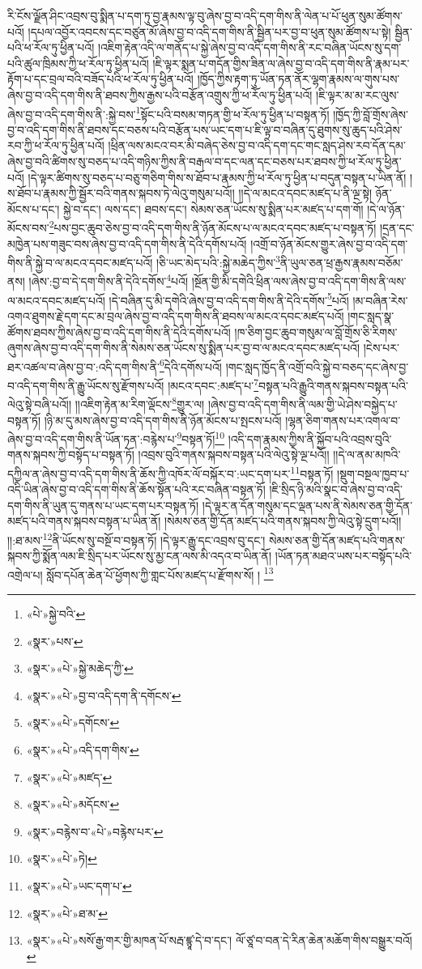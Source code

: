 རི་ངོས་ལྗོན་ཤིང་འབྲས་བུ་སྨིན་པ་དག་ཏུ་བྱ་རྣམས་ལྟ་བུ་ཞེས་བྱ་བ་འདི་དག་གིས་ནི་ལེན་པ་པོ་ཕུན་སུམ་ཚོགས་པའོ། །དཔལ་འབྱོར་འབངས་དང་བཙུན་མོ་ཞེས་བྱ་བ་འདི་དག་གིས་ནི་སྦྱིན་པར་བྱ་བ་ཕུན་སུམ་ཚོགས་པ་སྟེ། སྦྱིན་པའི་ཕ་རོལ་ཏུ་ཕྱིན་པའོ། །འཇིག་རྟེན་འདི་ལ་གནོད་པ་སྐྱེ་ཞེས་བྱ་བ་འདི་དག་གིས་ནི་རང་བཞིན་ཡོངས་སུ་དག་པའི་ཚུལ་ཁྲིམས་ཀྱི་ཕ་རོལ་ཏུ་ཕྱིན་པའོ། །ཇི་ལྟར་སྨན་པ་གདོན་གྱིས་ཟིན་ལ་ཞེས་བྱ་བ་འདི་དག་གིས་ནི་རྣམ་པར་རྟོག་པ་དང་བྲལ་བའི་བཟོད་པའི་ཕ་རོལ་ཏུ་ཕྱིན་པའོ། །ཁྱོད་ཀྱིས་རྟག་ཏུ་ཡོན་ཏན་ནོར་ལྷག་རྣམས་ལ་གུས་པས་ཞེས་བྱ་བ་འདི་དག་གིས་ནི་ཐབས་ཀྱིས་རྒྱས་པའི་བརྩོན་འགྲུས་ཀྱི་ཕ་རོལ་ཏུ་ཕྱིན་པའོ། །ཇི་ལྟར་མ་མ་རང་ལུས་ཞེས་བྱ་བ་འདི་དག་གིས་ནི་:སྐྱེ་བས་\footnote{«པེ་»སྐྱེ་བའི་}སྟོང་པའི་བསམ་གཏན་གྱི་ཕ་རོལ་ཏུ་ཕྱིན་པ་བསྟན་ཏོ། །ཁྱོད་ཀྱི་བློ་གྲོས་ཞེས་བྱ་བ་འདི་དག་གིས་ནི་ཐབས་དང་བཅས་པའི་བརྩོན་པས་ཡང་དག་པ་ཇི་ལྟ་བ་བཞིན་དུ་ཐུགས་སུ་ཆུད་པའི་ཤེས་རབ་ཀྱི་ཕ་རོལ་ཏུ་ཕྱིན་པའོ། །ཕྲིན་ལས་མངའ་བར་མི་བཞེད་ཅེས་བྱ་བ་འདི་དག་དང་གང་སླད་ཤེས་རབ་དོན་དམ་ཞེས་བྱ་བའི་ཚིགས་སུ་བཅད་པ་འདི་གཉིས་ཀྱིས་ནི་བརྒལ་བ་དང་ལན་དང་བཅས་པར་ཐབས་ཀྱི་ཕ་རོལ་ཏུ་ཕྱིན་པའོ། །དེ་ལྟར་ཚིགས་སུ་བཅད་པ་བཅུ་གཅིག་གིས་ས་ཐོབ་པ་རྣམས་ཀྱི་ཕ་རོལ་ཏུ་ཕྱིན་པ་བདུན་བསྟན་པ་ཡིན་ནོ། །ས་ཐོབ་པ་རྣམས་ཀྱི་སྦྱོར་བའི་གནས་སྐབས་ཏེ་ལེའུ་གསུམ་པའོ།། །།དེ་ལ་མངའ་དབང་མཛད་པ་ནི་ལྔ་སྟེ། ཉོན་མོངས་པ་དང་། སྐྱེ་བ་དང་། ལས་དང་། ཐབས་དང་། སེམས་ཅན་ཡོངས་སུ་སྨིན་པར་མཛད་པ་དག་གོ། །དེ་ལ་ཉོན་མོངས་བས་\footnote{«སྣར་»པས་}པས་བྱང་ཆུབ་ཅེས་བྱ་བ་འདི་དག་གིས་ནི་ཉོན་མོངས་པ་ལ་མངའ་དབང་མཛད་པ་བསྟན་ཏོ། །དྲན་དང་མཁྱེན་པས་གཟུང་བས་ཞེས་བྱ་བ་འདི་དག་གིས་ནི་དེའི་དགོས་པའོ། །འགྲོ་བ་ཉོན་མོངས་གྱུར་ཞེས་བྱ་བ་འདི་དག་གིས་ནི་སྐྱེ་བ་ལ་མངའ་དབང་མཛད་པའོ། །ཅི་ཡང་མེད་པའི་:སྐྱེ་མཆེད་ཀྱིས་\footnote{«སྣར་»«པེ་»སྐྱེ་མཆེད་ཀྱི་}ནི་ཡུལ་ཅན་ཕྲ་རྒྱས་རྣམས་བཅོམ་ནས། །ཞེས་:བྱ་བ་དེ་དག་གིས་ནི་དེའི་དགོས་\footnote{«སྣར་»«པེ་»བྱ་བ་འདི་དག་ནི་དགོངས་}པའོ། །སྔོན་གྱི་མི་དགེའི་ཕྲིན་ལས་ཞེས་བྱ་བ་འདི་དག་གིས་ནི་ལས་ལ་མངའ་དབང་མཛད་པའོ། །དེ་བཞིན་དུ་མི་དགེའི་ཞེས་བྱ་བ་འདི་དག་གིས་ནི་དེའི་དགོས་\footnote{«སྣར་»«པེ་»དགོངས་}པའོ། །མ་བཞིན་རེས་འགའ་ཐུགས་རྗེ་དག་དང་མ་བྲལ་ཞེས་བྱ་བ་འདི་དག་གིས་ནི་ཐབས་ལ་མངའ་དབང་མཛད་པའོ། །གང་སླད་སྣ་ཚོགས་ཐབས་ཀྱིས་ཞེས་བྱ་བ་འདི་དག་གིས་ནི་དེའི་དགོས་པའོ། །ཁ་ཅིག་བྱང་ཆུབ་གསུམ་ལ་བློ་གྲོས་ཅི་རིགས་ཞུགས་ཞེས་བྱ་བ་འདི་དག་གིས་ནི་སེམས་ཅན་ཡོངས་སུ་སྨིན་པར་བྱ་བ་ལ་མངའ་དབང་མཛད་པའོ། །ངེས་པར་ཐར་འཚལ་བ་ཞེས་བྱ་བ་:འདི་དག་གིས་ནི་\footnote{«སྣར་»«པེ་»འདི་དག་གིས་}དེའི་དགོས་པའོ། །གང་སླད་ཁྱོད་ནི་འགྲོ་བའི་སྐྱེ་བ་བཅད་དང་ཞེས་བྱ་བ་འདི་དག་གིས་ནི་རྒྱུ་ཡོངས་སུ་རྫོགས་པའོ། །མངའ་དབང་:མཛད་པ་\footnote{«སྣར་»«པེ་»མཛད་}བསྟན་པའི་རྒྱུའི་གནས་སྐབས་བསྟན་པའི་ལེའུ་སྟེ་བཞི་པའོ།། །།འཇིག་རྟེན་མ་རིག་ལྡོངས་\footnote{«སྣར་»«པེ་»མདོངས་}གྱུར་ལ། །ཞེས་བྱ་བ་འདི་དག་གིས་ནི་ལམ་གྱི་ཡེ་ཤེས་བསྐྱེད་པ་བསྟན་ཏོ། །ཉི་མ་དུ་མས་ཞེས་བྱ་བ་འདི་དག་གིས་ནི་ཉོན་མོངས་པ་སྤངས་པའོ། །ལྷན་ཅིག་གནས་པར་འགལ་བ་ཞེས་བྱ་བ་འདི་དག་གིས་ནི་ཡོན་ཏན་:བརྙེས་པ་\footnote{«སྣར་»བརྙེས་བ་«པེ་»བརྙེས་པར་}བསྟན་ཏོ།\footnote{«སྣར་»«པེ་»ཏེ།} །འདི་དག་རྣམས་ཀྱིས་ནི་སྐྱོབ་པའི་འབྲས་བུའི་གནས་སྐབས་ཀྱི་བསྟོད་པ་བསྟན་ཏོ། །འབྲས་བུའི་གནས་སྐབས་བསྟན་པའི་ལེའུ་སྟེ་ལྔ་པའོ།། །།དེ་ལ་ནམ་མཁའི་དཀྱིལ་ན་ཞེས་བྱ་བ་འདི་དག་གིས་ནི་ཆོས་ཀྱི་འཁོར་ལོ་བསྐོར་བ་:ཡང་དག་པར་\footnote{«སྣར་»«པེ་»ཡང་དག་པ་}བསྟན་ཏོ། །སྡུག་བསྔལ་ཁྱབ་པ་འདི་ཡིན་ཞེས་བྱ་བ་འདི་དག་གིས་ནི་ཆོས་སྟོན་པའི་རང་བཞིན་བསྟན་ཏོ། །ཇི་སྲིད་ཉི་མའི་སྣང་བ་ཞེས་བྱ་བ་འདི་དག་གིས་ནི་ཡུན་དུ་གནས་པ་ཡང་དག་པར་བསྟན་ཏོ། །དེ་ལྟར་ན་དོན་གསུམ་དང་ལྡན་པས་ནི་སེམས་ཅན་གྱི་དོན་མཛད་པའི་གནས་སྐབས་བསྟན་པ་ཡིན་ནོ། །སེམས་ཅན་གྱི་དོན་མཛད་པའི་གནས་སྐབས་ཀྱི་ལེའུ་སྟེ་དྲུག་པའོ།། །།:ཐ་མས་\footnote{«སྣར་»«པེ་»ཐ་མ་}ནི་ཡོངས་སུ་བསྔོ་བ་བསྟན་ཏོ། །དེ་ལྟར་རྒྱུ་དང་འབྲས་བུ་དང་། སེམས་ཅན་གྱི་དོན་མཛད་པའི་གནས་སྐབས་ཀྱི་སྨོན་ལམ་ཇི་སྲིད་པར་ཡོངས་སུ་མྱ་ངན་ལས་མི་འདའ་བ་ཡིན་ནོ། །ཡོན་ཏན་མཐའ་ཡས་པར་བསྟོད་པའི་འགྲེལ་པ། སློབ་དཔོན་ཆེན་པོ་ཕྱོགས་ཀྱི་གླང་པོས་མཛད་པ་རྫོགས་སོ། ། \footnote{«སྣར་»«པེ་»སསོ་རྒྱ་གར་གྱི་མཁན་པོ་སརྦ་ཛྙཱ་དེ་བ་དང་། ལོ་ཙཱ་བ་བན་དེ་རིན་ཆེན་མཆོག་གིས་བསྒྱུར་བའོ། }